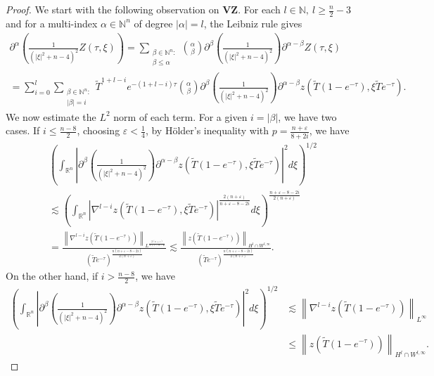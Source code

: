 \documentclass[12pt,reqno]{amsart}
\theoremstyle{plain}
\theoremstyle{remark}
\theoremstyle{plain}
\theoremstyle{definition}
\numberwithin{equation}{section}
\numberwithin{equation}{section}
\def\N{{\mathbb N}}
\def\R{{\mathbb R}}
\newcommand{\norm}[1]{\left\|#1\right\|}
\newcommand{\eps}{\varepsilon}
\begin{document}
	\begin{proof}
		We start with the following observation on $\mathbf{V}\mathbf{Z}$. For each $l\in \N,\ l\geq \frac{n}{2}-3$ and for a multi-index $\alpha\in\mathbb{N}^n$ of degree $\lvert \alpha\rvert=l$, the Leibniz rule gives
		\begin{multline*}
			\partial^{\alpha}\left(\frac{1}{(\lvert\xi\rvert^2+n-4)^2}Z(\tau,\xi)\right)=\sum_{\substack{\beta\in \mathbb{N}^n:\\ \beta\leq \alpha}} \binom{\alpha}{\beta}\partial^{\beta}\left(\frac{1}{(\lvert\xi\rvert^2+n-4)^2}\right)\partial^{\alpha-\beta}Z(\tau,\xi)\\
			=\sum_{i=0}^l \sum_{\substack{\beta\in \mathbb{N}^n:\\ \lvert \beta\rvert=i}}\tilde{T}^{1+l-i} e^{-(1+l-i)\tau}\binom{\alpha}{\beta} \partial^{\beta}\left(\frac{1}{(\lvert\xi\rvert^2+n-4)^2}\right)\partial^{\alpha-\beta} z (\tilde{T}(1-e^{-\tau}),\xi \tilde{T} e^{-\tau}).
		\end{multline*}
        We now estimate the $L^2$ norm of each term. For a given $i=\lvert \beta\rvert$, we have two cases.
		If $i\leq  \frac{n-8}{2}$, choosing $\eps <\frac{1}{4}$, by H\"older's inequality with $p=\frac{n+\eps}{8+2i}$, we have
		\begin{multline*}
			\left(\int_{\R^n}\left\lvert\partial^{\beta}\left(\frac{1}{(\lvert\xi\rvert^2+n-4)^2}\right) \partial^{\alpha-\beta}z (\tilde{T}(1-e^{-\tau}),\xi \tilde{T} e^{-\tau})\right\rvert^2 d\xi\right)^{1/2}\\ \lesssim \left(\int_{\R^n}\left\lvert\nabla^{l-i}z (\tilde{T}(1-e^{-\tau}),\xi \tilde{T} e^{-\tau})\right\rvert^\frac{2(n+\eps)}{n+\eps-8-2i} d\xi\right)^{\frac{n+\eps-8-2i}{2(n+\eps)}}\\  =\frac{\norm{\nabla^{l-i}z(\tilde{T}(1-e^{-\tau}))}_{L^{\frac{2(n+\eps)}{n+\eps-8-2i}}}}{(\tilde{T} e^{-\tau})^{\frac{n(n+\eps-8-2i)}{2(n+\eps)}}}  \lesssim \frac{\norm{z(\tilde{T}(1-e^{-\tau}))}_{H^l\cap W^{l,\infty}}}{(\tilde{T} e^{-\tau})^{\frac{n(n+\eps-8-2i)}{2(n+\eps)}}}.
		\end{multline*}
		On the other hand, if $i> \frac{n-8}{2}$, we have
		\begin{align*}
			\left(\int_{\R^n}\left\lvert\partial^{\beta}\left(\frac{1}{(\lvert\xi\rvert^2+n-4)^2}\right)\partial^{\alpha-\beta}z (\tilde{T}(1-e^{-\tau}),\xi \tilde{T} e^{-\tau})\right\rvert^2 d\xi\right)^{1/2}&\lesssim \norm{\nabla^{l-i}z(\tilde{T}(1-e^{-\tau}))}_{L^\infty}\\ &\leq \norm{z(\tilde{T}(1-e^{-\tau}))}_{H^l\cap W^{l,\infty}}.

\end{align*}
\end{proof}
\end{document}
